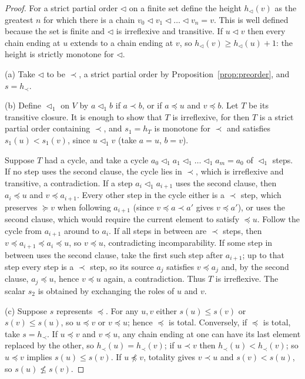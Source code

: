 \begin{proof}
For a strict partial order $\lhd$ on a finite set define the height $h_\lhd(v)$ as the greatest $n$ for which there is a chain $v_0\lhd v_1\lhd\dots\lhd v_n=v$. This is well defined because the set is finite and $\lhd$ is irreflexive and transitive. If $u\lhd v$ then every chain ending at $u$ extends to a chain ending at $v$, so $h_\lhd(v)\ge h_\lhd(u)+1$: the height is strictly monotone for $\lhd$.

(a) Take $\lhd$ to be $\prec$, a strict partial order by Proposition~\ref{prop:preorder}, and $s=h_\prec$.

(b) Define $\lhd_1$ on $V$ by $a\lhd_1 b$ if $a\prec b$, or if $a\preceq u$ and $v\preceq b$. Let $T$ be its transitive closure. It is enough to show that $T$ is irreflexive, for then $T$ is a strict partial order containing $\prec$, and $s_1=h_T$ is monotone for $\prec$ and satisfies $s_1(u)<s_1(v)$, since $u\lhd_1 v$ (take $a=u$, $b=v$).

Suppose $T$ had a cycle, and take a cycle $a_0\lhd_1 a_1\lhd_1\dots\lhd_1 a_m=a_0$ of $\lhd_1$ steps. If no step uses the second clause, the cycle lies in $\prec$, which is irreflexive and transitive, a contradiction. If a step $a_i\lhd_1a_{i+1}$ uses the second clause, then $a_i\preceq u$ and $v\preceq a_{i+1}$. Every other step in the cycle either is a $\prec$ step, which preserves $\succeq v$ when following $a_{i+1}$ (since $v\preceq a\prec a'$ gives $v\preceq a'$), or uses the second clause, which would require the current element to satisfy $\preceq u$. Follow the cycle from $a_{i+1}$ around to $a_i$. If all steps in between are $\prec$ steps, then $v\preceq a_{i+1}\preceq a_i\preceq u$, so $v\preceq u$, contradicting incomparability. If some step in between uses the second clause, take the first such step after $a_{i+1}$; up to that step every step is a $\prec$ step, so its source $a_j$ satisfies $v\preceq a_j$ and, by the second clause, $a_j\preceq u$, hence $v\preceq u$ again, a contradiction. Thus $T$ is irreflexive. The scalar $s_2$ is obtained by exchanging the roles of $u$ and $v$.

(c) Suppose $s$ represents $\preceq$. For any $u,v$ either $s(u)\le s(v)$ or $s(v)\le s(u)$, so $u\preceq v$ or $v\preceq u$; hence $\preceq$ is total. Conversely, if $\preceq$ is total, take $s=h_\prec$. If $u\preceq v$ and $v\preceq u$, any chain ending at one can have its last element replaced by the other, so $h_\prec(u)=h_\prec(v)$; if $u\prec v$ then $h_\prec(u)<h_\prec(v)$; so $u\preceq v$ implies $s(u)\le s(v)$. If $u\not\preceq v$, totality gives $v\prec u$ and $s(v)<s(u)$, so $s(u)\not\le s(v)$.
\end{proof}

